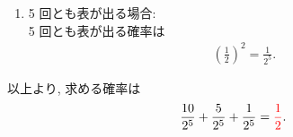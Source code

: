 \begin{qenumerate}
{\begin{enumerate}
{\begin{enumerate}
{						ちょうど 4 回表が出る場合: \\
						ちょうど 4 回表が出る出方は ``表, 表, 表, 表, 裏'' の並べ替えを考えると $\dfrac{\permu{5}{5}}{\permu{4}{4}} = 5$ 通りである.
						それぞれが起こる確率は
						\begin{align}
							\left(\frac{1}{2}\right)^{4}\cdot\frac{1}{2} = \frac{1}{2^{5}}
						\end{align}
						だから, ちょうど 4 回表が出る確率は
						\begin{align}
							5\cdot\frac{1}{2^{5}} = \frac{5}{2^{5}}.
						\end{align}
					}
					\item{
						5 回とも表が出る場合: \\
						5 回とも表が出る確率は
						\begin{align}
							\left(\frac{1}{2}\right)^{2} = \frac{1}{2^{5}}.
						\end{align}
					}
				\end{enumerate}
				以上より, 求める確率は
				\begin{align}
					\frac{10}{2^{5}} + \frac{5}{2^{5}} + \frac{1}{2^{5}} = \textcolor{red}{\frac{1}{2}}.
				\end{align}

}
\end{enumerate}}
\end{qenumerate}

